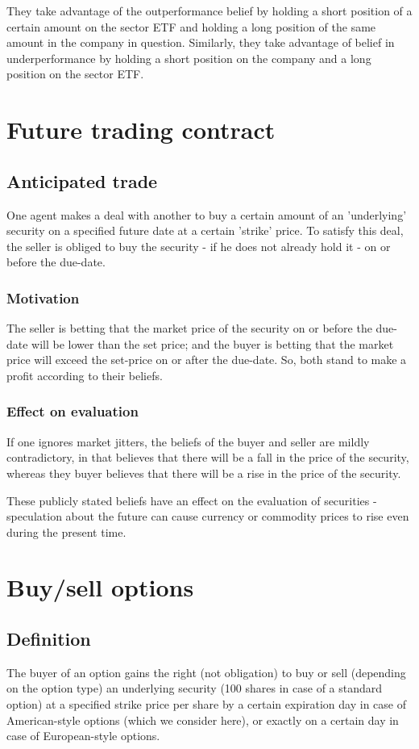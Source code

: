 \documentclass[oneside, article]{memoir}
\begin{document}
They take advantage of the outperformance belief by holding a short position of a certain amount on the sector ETF and holding a long position of the same amount in the company in question. Similarly, they take advantage of belief in underperformance by holding a short position on the company and a long position on the sector ETF.

\section{Future trading contract}
\subsection{Anticipated trade}
One agent makes a deal with another to buy a certain amount of an 'underlying' security on a specified future date at a certain 'strike' price. To satisfy this deal, the seller is obliged to buy the security - if he does not already hold it - on or before the due-date.

\subsubsection{Motivation}
The seller is betting that the market price of the security on or before the due-date will be lower than the set price; and the buyer is betting that the market price will exceed the set-price on or after the due-date. So, both stand to make a profit according to their beliefs.

\subsubsection{Effect on evaluation}
If one ignores market jitters, the beliefs of the buyer and seller are mildly contradictory, in that believes that there will be a fall in the price of the security, whereas they buyer believes that there will be a rise in the price of the security.

These publicly stated beliefs have an effect on the evaluation of securities - speculation about the future can cause currency or commodity prices to rise even during the present time.

\section{Buy/sell options}
\subsection{Definition}
The buyer of an option gains the right (not obligation) to buy or sell (depending on the option type) an underlying security (100 shares in case of a standard option) at a specified strike price per share by a certain expiration day in case of American-style options (which we consider here), or exactly on a certain day in case of European-style options.
\end{document}
